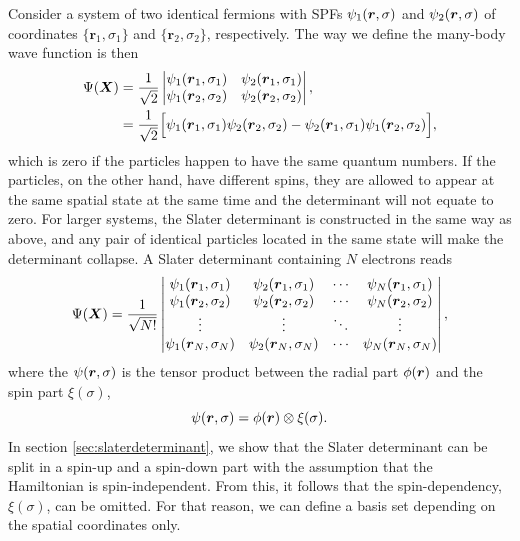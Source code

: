 Consider a system of two identical fermions with SPFs $\psi_1(\boldsymbol{{r}},\sigma)$ and $\psi_2(\boldsymbol{{r}},\sigma)$ of coordinates $\{\boldsymbol{r}_1,\sigma_1\}$ and $\{\boldsymbol{r}_2,\sigma_2\}$, respectively. The way we define the many-body wave function is then
\begin{equation}
\begin{aligned}
\Psi(\boldsymbol{{X}})&=\frac{1}{\sqrt{2}}
\begin{vmatrix}
\psi_1(\boldsymbol{r}_1,\sigma_1) & \psi_2(\boldsymbol{r}_1,\sigma_1)\\
\psi_1(\boldsymbol{r}_2,\sigma_2) & \psi_2(\boldsymbol{r}_2,\sigma_2)
\end{vmatrix},\\
&=\frac{1}{\sqrt{2}}\Big[\psi_1(\boldsymbol{r}_1,\sigma_1)\psi_2(\boldsymbol{r}_2,\sigma_2)-\psi_2(\boldsymbol{r}_1,\sigma_1)\psi_1(\boldsymbol{r}_2,\sigma_2)\Big],
\end{aligned}
\end{equation}
which is zero if the particles happen to have the same quantum numbers. If the particles, on the other hand, have different spins, they are allowed to appear at the same spatial state at the same time and the determinant will not equate to zero. For larger systems, the Slater determinant is constructed in the same way as above, and any pair of identical particles located in the same state will make the determinant collapse. A Slater determinant containing $N$ electrons reads
\begin{equation}
\Psi(\boldsymbol{{X}})=\frac{1}{\sqrt{N!}}
\begin{vmatrix}
\psi_1(\boldsymbol{r}_1,\sigma_1) & \psi_2(\boldsymbol{r}_1,\sigma_1) & \cdots & \psi_N(\boldsymbol{r}_1,\sigma_1)\\
\psi_1(\boldsymbol{r}_2,\sigma_2) & \psi_2(\boldsymbol{r}_2,\sigma_2) & \cdots & \psi_N(\boldsymbol{r}_2,\sigma_2)\\
\vdots & \vdots & \ddots & \vdots \\
\psi_1(\boldsymbol{r}_N,\sigma_N) & \psi_2(\boldsymbol{r}_N,\sigma_N) & \cdots & \psi_N(\boldsymbol{r}_N,\sigma_N)
\end{vmatrix},
\end{equation}
where the $\psi(\boldsymbol{{r}},\sigma)$ is the tensor product between the radial part $\phi(\boldsymbol{{r}})$ and the spin part $\xi(\sigma)$,
\begin{equation}
\psi(\boldsymbol{{r}},\sigma)=\phi(\boldsymbol{{r}})\otimes\xi(\sigma).
\end{equation}
In section \ref{sec:slaterdeterminant}, we show that the Slater determinant can be split in a spin-up and a spin-down part with the assumption that the Hamiltonian is spin-independent. From this, it follows that the spin-dependency, $\xi(\sigma)$, can be omitted. For that reason, we can define a basis set depending on the spatial coordinates only.

